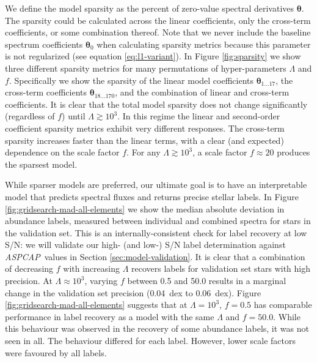 \documentclass[12pt,preprint]{aastex}
\newcommand{\project}[1]{\textsl{#1}}
\newcommand{\acronym}[1]{{\small{#1}}}
\newcommand{\aspcap}{\project{\acronym{ASPCAP}}}
\newcommand{\Dvector}[1]{\boldsymbol{#1}}
\newcommand{\vectheta}{\Dvector{\theta}}
\begin{document}
We define the model sparsity as the percent of zero-value spectral derivatives 
$\vectheta$.  The sparsity could be calculated across the linear 
coefficients, only the cross-term coefficients, or some combination thereof.  
Note that we never include the baseline spectrum coefficients $\vectheta_0$ when 
calculating sparsity metrics because this parameter is not regularized (see 
equation \ref{eq:l1-variant}).  In Figure \ref{fig:sparsity} we show three 
different sparsity metrics for many permutations of hyper-parameters $\Lambda$ 
and $f$.  Specifically we show the sparsity of the linear model coefficients 
$\vectheta_{1...17}$, the cross-term coefficients $\vectheta_{18...170}$, and 
the combination of linear and cross-term coefficients.  It is clear that the 
total model sparsity does not change significantly (regardless of $f$) until 
$\Lambda \gtrsim 10^3$.  In this regime the linear and second-order coefficient 
sparsity metrics exhibit very different responses.  The cross-term sparsity 
increases faster than the linear terms, with a clear (and expected) dependence 
on the scale factor $f$.  For any $\Lambda \gtrsim 10^3$, a scale factor 
$f \approx 20$ produces the sparsest model.


While sparser models are preferred, our ultimate goal is to have an 
interpretable model that predicts spectral fluxes and returns precise stellar
labels.  In Figure \ref{fig:gridsearch-mad-all-elements} we show the median
absolute deviation in abundance labels, measured between individual and combined
spectra for stars in the validation set.  This is an internally-consistent
check for label recovery at low S/N: we will validate our high- (and low-) S/N
label determination against \aspcap\ values in Section \ref{sec:model-validation}.  It is
clear that a combination of decreasing $f$ with increasing $\Lambda$ recovers
labels for validation set stars with high precision.  At $\Lambda \approx 10^3$,
varying $f$ between 0.5 and 50.0 results in a marginal change in the validation
set precision (0.04~dex to 0.06~dex).  Figure \ref{fig:gridsearch-mad-all-elements}
suggests that at $\Lambda = 10^3$, $f = 0.5$ has comparable performance in
label recovery as a model with the same $\Lambda$ and $f = 50.0$.  While this
behaviour was observed in the recovery of some abundance labels, it was not seen in all. 
The behaviour differed for each label.  However, lower scale factors were favoured by all labels.
\end{document}
